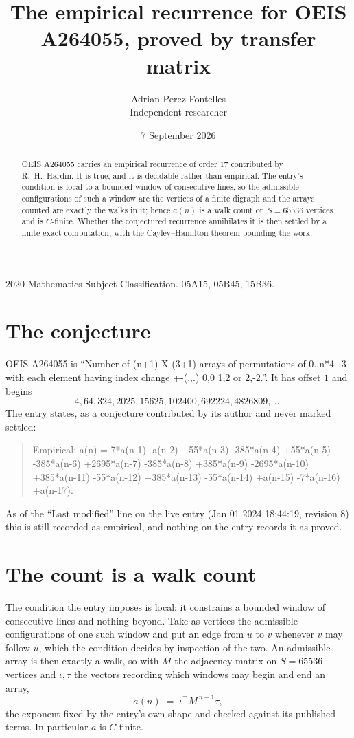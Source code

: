 \documentclass[11pt,a4paper]{article}
\title{The empirical recurrence for OEIS A264055, proved by transfer matrix}
\author{Adrian Perez Fontelles\\ \small Independent researcher}
\date{7 September 2026}
\theoremstyle{plain}
\theoremstyle{definition}
\begin{document}
\maketitle

\begin{abstract}
OEIS A264055 carries an empirical recurrence of order $17$ contributed by R.~H.~Hardin. It is
true, and it is decidable rather than empirical. The entry's condition is local to a bounded window of consecutive lines, so
the admissible configurations of such a window are the vertices of a finite digraph and the
arrays counted are exactly the walks in it; hence $a(n)$ is a walk count on $S=65536$ vertices
and is $C$-finite. Whether the conjectured recurrence annihilates it is then settled by a
finite exact computation, with the Cayley--Hamilton theorem bounding the work.
\end{abstract}

\noindent\small 2020 Mathematics Subject Classification. 05A15, 05B45, 15B36.\normalsize

\section{The conjecture}

OEIS A264055 is ``Number of (n+1) X (3+1) arrays of permutations of 0..n*4+3 with each element having index change +-(.,.) 0,0 1,2 or 2,-2.''. It has offset $1$ and begins
\[
4, 64, 324, 2025, 15625, 102400, 692224, 4826809,\ \dots
\]
The entry states, as a conjecture contributed by its author and never marked settled:
\begin{quote}
Empirical: a(n) = 7*a(n-1) -a(n-2) +55*a(n-3) -385*a(n-4) +55*a(n-5) -385*a(n-6) +2695*a(n-7) -385*a(n-8) +385*a(n-9) -2695*a(n-10) +385*a(n-11) -55*a(n-12) +385*a(n-13) -55*a(n-14) +a(n-15) -7*a(n-16) +a(n-17).
\end{quote}
As of the ``Last modified'' line on the live entry (Jan 01 2024 18:44:19, revision 8) this is still
recorded as empirical, and nothing on the entry records it as proved.

\section{The count is a walk count}

The condition the entry imposes is local: it constrains a bounded window of consecutive lines and nothing beyond. Take as
vertices the admissible configurations of one such window and put an edge from $u$ to $v$
whenever $v$ may follow $u$, which the condition decides by inspection of the two. An
admissible array is then exactly a walk, so with $M$ the adjacency matrix on $S=65536$ vertices
and $\iota,\tau$ the vectors recording which windows may begin and end an array,
\[
a(n)\;=\;\iota^{\!\top}M^{\,n+1}\tau ,
\]
the exponent fixed by the entry's own shape and checked against its published terms. In
particular $a$ is $C$-finite.
\end{document}
